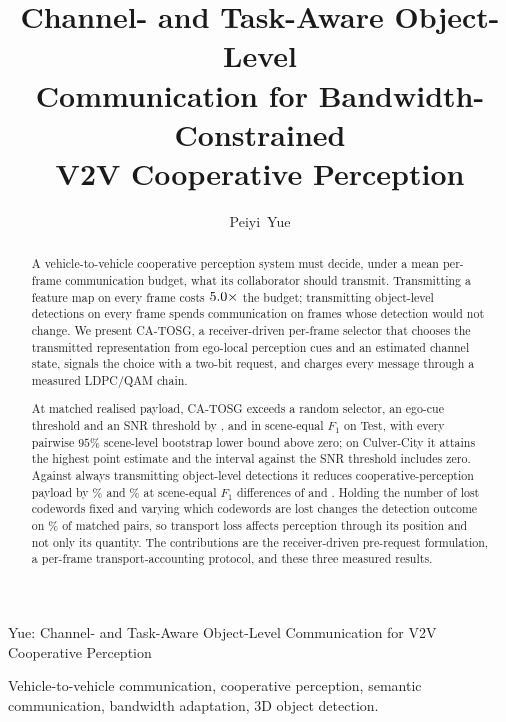 \documentclass[journal]{IEEEtran}
\newcommand{\method}{CA-TOSG}
\begin{document}
\title{Channel- and Task-Aware Object-Level\\Communication for Bandwidth-Constrained\\V2V Cooperative Perception}
\author{Peiyi~Yue}
{Yue: Channel- and Task-Aware Object-Level Communication for V2V Cooperative Perception}
\maketitle

\begin{abstract}
A vehicle-to-vehicle cooperative perception system must decide, under a mean per-frame
communication budget, what its collaborator should transmit. Transmitting a feature map on every
frame costs $5.0\times$ the budget; transmitting object-level detections on every
frame spends communication on frames whose detection would not change. We present \method{}, a
receiver-driven per-frame selector that chooses the transmitted representation from ego-local
perception cues and an estimated channel state, signals the choice with a two-bit request, and
charges every message through a measured LDPC/QAM chain.

At matched realised payload, \method{} exceeds a random selector, an ego-cue threshold and an SNR
threshold by \TestMPRandomDelta, \TestMPTaskOnlyDelta{} and \TestMPSnrOnlyDelta{} in scene-equal
$F_1$ on Test, with every pairwise $95\%$ scene-level bootstrap lower bound above zero; on
Culver-City it attains the highest point estimate and the interval against the SNR threshold
includes zero. Against always transmitting object-level detections it reduces
cooperative-perception payload by \TestSavingVsFixedL\% and \CulverSavingVsFixedL\% at scene-equal
$F_1$ differences of \TestDeltaFoneVsFixedL{} and \CulverDeltaFoneVsFixedL. Holding the number of
lost codewords fixed and varying which codewords are lost changes the detection outcome on
\PosIdealPct\% of matched pairs, so transport loss affects perception through its position and not
only its quantity. The contributions are the receiver-driven pre-request formulation, a per-frame
transport-accounting protocol, and these three measured results.
\end{abstract}

\begin{IEEEkeywords}
Vehicle-to-vehicle communication, cooperative perception, semantic communication, bandwidth
adaptation, 3D object detection.
\end{IEEEkeywords}
\end{document}
